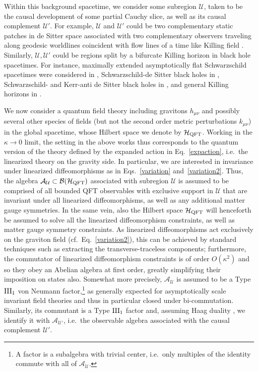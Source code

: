 \documentclass[]{jkpaper}
\theoremstyle{plain}
\theoremstyle{definition}
\begin{document}
Within this background spacetime, we consider some subregion $\mathcal U$, taken to be the causal development of some partial Cauchy slice, as well as its causal complement $\mathcal U'$. For example, $\mathcal{U}$ and $\mathcal{U}'$ could be two complementary static patches in de Sitter space associated with two complementary observers traveling along geodesic worldlines coincident with flow lines of a time like Killing field \cite{Chandrasekaran:2022cip,Kolchmeyer:2024fly,Chen:2024rpx,Kudler-Flam:2023hkl}. Similarly, $\mathcal{U},\mathcal{U}'$ could be regions split by a bifurcate Killing horizon in black hole spacetimes. For instance, maximally extended asymptotically flat Schwarzschild spacetimes were considered in \cite{Chandrasekaran:2022cip,Kudler-Flam:2023qfl,Chen:2024rpx}, Schwarzschild-de Sitter black holes in \cite{Kudler-Flam:2023qfl,Chen:2024rpx}, Schwarzschild- and Kerr-anti de Sitter black holes in \cite{Kudler-Flam:2023qfl}, and general Killing horizons in \cite{Kudler-Flam:2023qfl,Faulkner:2024gst,KirklinGSL}.

We now consider a quantum field theory including gravitons $h_{\mu \nu}$ and possibly several other species of fields (but not the second order metric perturbations $k_{\mu \nu}$) in the global spacetime, whose Hilbert space we denote by $\mathcal H_{\rm QFT}$. Working in the $\kappa\to0$ limit, the setting in the above works thus corresponds to the quantum version of the theory defined by the expanded action in Eq.~\eqref{expaction}, i.e.\ the linearized theory on the gravity side. In particular, we are interested in invariance under linearized diffeomorphisms as in Eqs.~\eqref{variation} and~\eqref{variation2}. Thus, the algebra $\mathcal{A}_\mathcal{U}\subset\mathcal{B}(\mathcal{H}_{\rm QFT})$ associated with subregion $\mathcal{U}$ is assumed to be comprised of all bounded QFT observables with exclusive support in $\mathcal{U}$ that are invariant under all linearized diffeomorphisms, as well as any additional matter gauge symmetries. In the same vein, also the Hilbert space $\mathcal{H}_{\rm QFT}$ will henceforth be assumed to solve all the linearized diffeomorphism constraints, as well as matter gauge symmetry constraints. As linearized diffeomorphisms act exclusively on the graviton field (cf.~Eq.~\eqref{variation2}), this can be achieved by standard techniques such as extracting the transverse-traceless components; furthermore, the commutator of linearized diffeomorphism constraints is of order $O(\kappa^2)$ and so they obey an Abelian algebra at first order, greatly simplifying their imposition on states also. Somewhat more precisely, $\mathcal{A}_{\mathcal{U}}$ is assumed to be a Type $\rm{III}_1$ von Neumann factor,\footnote{A factor is a subalgebra with trivial center, i.e.\ only multiples of the identity commute with all of $\mathcal{A}_\mathcal{U}$.} as generally expected for asymptotically scale invariant field theories \cite{Fredenhagen:1984dc,Buchholz:1986bg,Buchholz:1995gr,haag2012local,Yngvason_2005} and thus in particular closed under bi-commutation. Similarly, its commutant is a Type $\rm{III}_1$ factor and, assuming Haag duality \cite{haag2012local,WittenRevModPhys.90.045003}, we identify it with $\mathcal{A}_{\mathcal{U'}}$, i.e.\ the observable algebra associated with the causal complement $\mathcal U'$. 
\end{document}
